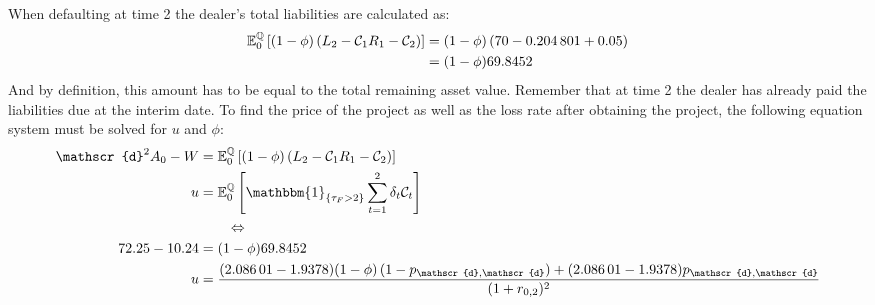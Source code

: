 \documentclass[main.tex]{subfiles}
\begin{document}
            When defaulting at time 2
            the dealer's total liabilities are calculated as:
            \begin{align*}
                \mathbb{E}_{0}^{\mathbb{Q}}\left[
                    (1-\phi)\left(
                        L_{2} - 
                        \mathcal{C}_{1}R_{1}
                        - \mathcal{C}_2
                    \right)
                \right]
                &=
                (1-\phi)\left(\num{70} - \num{0.204801} + \num{0.05}\right)\\
                &=
                (1-\phi)\num{69.8452}
            \end{align*}
            And by definition, this amount has to be equal to the total remaining asset value.
            Remember that at time 2 the dealer has already paid the liabilities due at the interim date.
            To find the price of the project
            as well as the loss rate after obtaining the project,
            the following equation system must be solved for $u$ and $\phi$:
            \begin{align}
                \mathscr{d}^{2}A_{0} - W&=
                \mathbb{E}_{0}^{\rnmeasure}\left[
                    (1-\phi)\left(
                        L_{2} - 
                        \mathcal{C}_{1}R_{1}
                        - \mathcal{C}_2
                    \right)
                \right]
                \label{eqn:swap-example-equation-system-1}
                \\
                u &=
                \mathbb{E}_{0}^{\rnmeasure}\left[
                    \mathbbm{1}_{\{\tau_{F}>2\}} 
                    \sum_{t=1}^{2}
                    \delta_{t}\mathcal{C}_{t}
                \right]
                \label{eqn:swap-example-equation-system-2}
                \\
                &\qquad
                \Leftrightarrow
                \nonumber
                \\
                \num{72.25} - \num{10.24}
                &=
                (1-\phi)\num{69.8452}
                \nonumber
                \\
                u &=
                \frac{
                    (\num{2.08601} - \num{1.9378})(1-\phi)\left(1-p_{\mathscr{d},\mathscr{d}}\right)
                    +
                    (\num{2.08601} - \num{1.9378})p_{\mathscr{d},\mathscr{d}}
                }{
                    (1+r_{0,2})^{2}
                }
                \nonumber
            \end{align}
\end{document}
